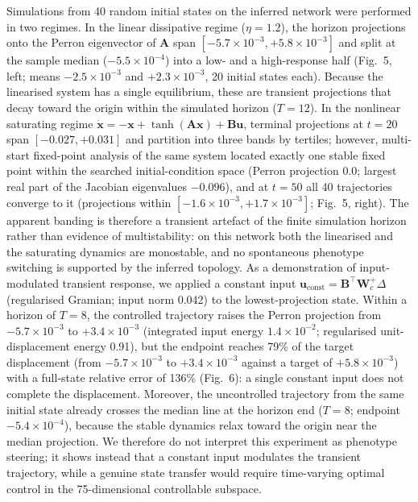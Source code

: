 \documentclass[12pt]{article}
\begin{document}
Simulations from 40 random initial states on the inferred network were
performed in two regimes. In the linear dissipative regime ($\eta = 1.2$),
the horizon projections onto the Perron eigenvector of $\mathbf{A}$ span
$[-5.7\times10^{-3}, +5.8\times10^{-3}]$ and split at the sample median
($-5.5\times10^{-4}$) into a low- and a high-response half (Fig.~5, left;
means $-2.5\times10^{-3}$ and $+2.3\times10^{-3}$, 20 initial states each).
Because the linearised system has a single equilibrium, these are transient
projections that decay toward the origin within the simulated horizon
($T = 12$). In the nonlinear saturating regime
$\dot{\mathbf{x}} = -\mathbf{x} + \tanh(\mathbf{A}\mathbf{x}) +
\mathbf{B}\mathbf{u}$, terminal projections at $t = 20$ span
$[-0.027, +0.031]$ and partition into three bands by tertiles; however,
multi-start fixed-point analysis of the same system located exactly one
stable fixed point within the searched initial-condition space (Perron
projection 0.0; largest real part of the Jacobian eigenvalues $-0.096$),
and at $t = 50$ all 40 trajectories converge to it (projections within
$[-1.6\times10^{-3}, +1.7\times10^{-3}]$; Fig.~5, right). The apparent banding is
therefore a transient artefact of the finite simulation horizon rather than
evidence of multistability: on this network both the linearised and the
saturating dynamics are monostable, and no spontaneous phenotype switching
is supported by the inferred topology. As a demonstration of input-modulated
transient response, we applied a constant input
$\mathbf{u}_{\mathrm{const}} = \mathbf{B}^{\top}\mathbf{W}_c^{+}\Delta$
(regularised Gramian; input norm 0.042) to the lowest-projection state.
Within a horizon of $T = 8$, the controlled trajectory raises the Perron
projection from $-5.7\times10^{-3}$ to $+3.4\times10^{-3}$ (integrated input
energy $1.4\times10^{-2}$; regularised unit-displacement energy 0.91), but
the endpoint reaches 79\% of the target displacement (from
$-5.7\times10^{-3}$ to $+3.4\times10^{-3}$ against a target of
$+5.8\times10^{-3}$) with a full-state relative error of 136\%
(Fig.~6): a single constant input does not complete the
displacement. Moreover, the uncontrolled trajectory from the same initial
state already crosses the median line at the horizon end ($T = 8$; endpoint
$-5.4\times10^{-4}$), because the stable dynamics relax toward the origin
near the median projection. We therefore do not interpret this experiment as
phenotype steering; it shows instead that a constant input modulates the
transient trajectory, while a genuine state transfer would require
time-varying optimal control in the 75-dimensional controllable subspace.
\end{document}
